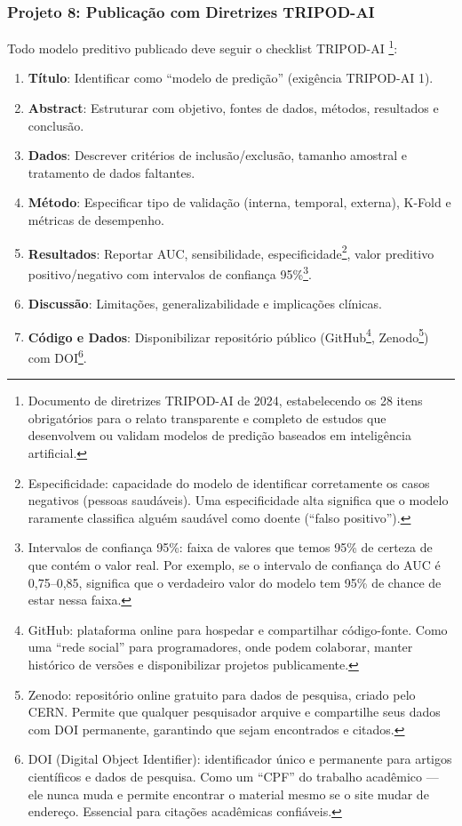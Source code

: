 \subsubsection*{Projeto 8: Publicação com Diretrizes TRIPOD-AI}

Todo modelo preditivo publicado deve seguir o checklist TRIPOD-AI \cite{tripod2024}\footnote{Documento de diretrizes TRIPOD-AI de 2024, estabelecendo os 28 itens obrigatórios para o relato transparente e completo de estudos que desenvolvem ou validam modelos de predição baseados em inteligência artificial.}:

\begin{enumerate}
    \item \textbf{Título}: Identificar como ``modelo de predição'' (exigência TRIPOD-AI 1).
    \item \textbf{Abstract}: Estruturar com objetivo, fontes de dados, métodos, resultados e conclusão.
    \item \textbf{Dados}: Descrever critérios de inclusão/exclusão, tamanho amostral e tratamento de dados faltantes.
    \item \textbf{Método}: Especificar tipo de validação (interna, temporal, externa), K-Fold e métricas de desempenho.
    \item \textbf{Resultados}: Reportar AUC, sensibilidade, especificidade\protect\footnote{Especificidade: capacidade do modelo de identificar corretamente os casos negativos (pessoas saudáveis). Uma especificidade alta significa que o modelo raramente classifica alguém saudável como doente (``falso positivo'').}, valor preditivo positivo/negativo com intervalos de confiança 95\%\protect\footnote{Intervalos de confiança 95\%: faixa de valores que temos 95\% de certeza de que contém o valor real. Por exemplo, se o intervalo de confiança do AUC é 0,75--0,85, significa que o verdadeiro valor do modelo tem 95\% de chance de estar nessa faixa.}.
    \item \textbf{Discussão}: Limitações, generalizabilidade e implicações clínicas.
    \item \textbf{Código e Dados}: Disponibilizar repositório público (GitHub\protect\footnote{GitHub: plataforma online para hospedar e compartilhar código-fonte. Como uma ``rede social'' para programadores, onde podem colaborar, manter histórico de versões e disponibilizar projetos publicamente.}, Zenodo\protect\footnote{Zenodo: repositório online gratuito para dados de pesquisa, criado pelo CERN. Permite que qualquer pesquisador arquive e compartilhe seus dados com DOI permanente, garantindo que sejam encontrados e citados.}) com DOI\protect\footnote{DOI (Digital Object Identifier): identificador único e permanente para artigos científicos e dados de pesquisa. Como um ``CPF'' do trabalho acadêmico --- ele nunca muda e permite encontrar o material mesmo se o site mudar de endereço. Essencial para citações acadêmicas confiáveis.}.
\end{enumerate}

